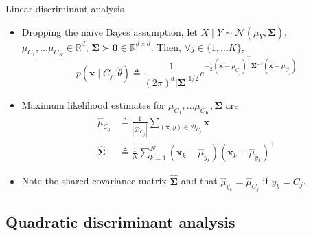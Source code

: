 \documentclass{beamer}
\numberwithin{equation}{section}
\begin{document}
\begin{frame}{Linear discriminant analysis}
    \begin{itemize}
        \item
        Dropping the naive Bayes assumption, let
        $ X \mid Y \sim \mathcal{N}(\mu_Y, \mathbf{\Sigma}) $, $ \mu_{C_1},
        \ldots \mu_{C_K} \in \mathbb{R}^d $, $ \mathbf{\Sigma} \succ \mathbf{0}
        \in \mathbb{R}^{d \times d} $.
        Then, $ \forall j \in \{1, \ldots K\} $,
        \begin{equation} \label{lda_like}
            p(\mathbf{x} \mid C_j, \hat{\theta}) \triangleq \frac{1}{
                (2\pi)^d|\mathbf{\Sigma}|^{1 / 2}
            }e^{
                -\frac{1}{2}(\mathbf{x} - \mu_{C_j})^\top
                \mathbf{\Sigma}^{-1}(\mathbf{x} - \mu_{C_j})
            }
        \end{equation}

        \item
        Maximum likelihood estimates for $ \mu_{C_1}, \ldots \mu_{C_K},
        \mathbf{\Sigma} $ are
        \begin{equation}
            \begin{split}
            \hat{\mu}_{C_j} & \triangleq \frac{1}{|\mathcal{D}_{C_j}|}
                \sum_{(\mathbf{x}, y) \in \mathcal{D}_{C_j}}\mathbf{x} \\
            \hat{\mathbf{\Sigma}} & \triangleq
                \frac{1}{N}
                \sum_{k = 1}^N
                (\mathbf{x}_k - \hat{\mu}_{y_k})
                (\mathbf{x}_k - \hat{\mu}_{y_k})^\top
            \end{split}
        \end{equation}

        \item
        Note the shared covariance matrix $ \hat{\mathbf{\Sigma}} $ and that
        $ \hat{\mu}_{y_k} = \hat{\mu}_{C_j} $ if $ y_k = C_j $.
    \end{itemize}
\end{frame}

\subsection{Quadratic discriminant analysis}
\end{document}
